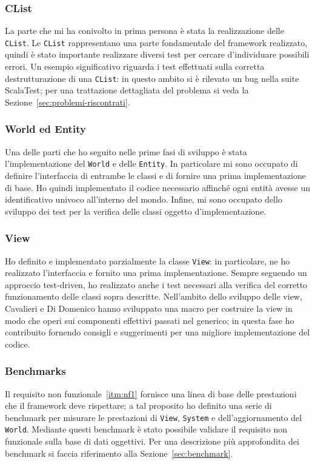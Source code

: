\subsubsection{CList}
La parte che mi ha conivolto in prima persona è stata la realizzazione delle \texttt{CList}.
Le \texttt{CList} rappresentano una parte fondamentale del framework realizzato, quindi è stato importante realizzare
diversi test per cercare d'individuare possibili errori.
Un esempio significativo riguarda i test effettuati sulla corretta destrutturazione di una \texttt{CList}: in questo
ambito si è rilevato un bug nella suite ScalaTest;
per una trattazione dettagliata del problema si veda la Sezione~\ref{sec:problemi-riscontrati}.

\subsubsection{World ed Entity}
Una delle parti che ho seguito nelle prime fasi di sviluppo è stata l'implementazione del \texttt{World} e delle
\texttt{Entity}.
In particolare mi sono occupato di definire l'interfaccia di entrambe le classi e di fornire una prima implementazione
di base.
Ho quindi implementato il codice necessario affinché ogni entità avesse un identificativo univoco all'interno del mondo.
Infine, mi sono occupato dello sviluppo dei test per la verifica delle classi oggetto d'implementazione.

\subsubsection{View}
Ho definito e implementato parzialmente la classe \texttt{View}: in particolare, ne ho realizzato l'interfaccia e
fornito una prima implementazione.
Sempre seguendo un approccio test-driven, ho realizzato anche i test necessari alla verifica del corretto funzionamento
delle classi sopra descritte.
Nell'ambito dello sviluppo delle view, Cavalieri e Di Domenico hanno sviluppato una macro per costruire la
view in modo che operi sui componenti effettivi passati nel generico;
in questa fase ho contribuito fornendo consigli e suggerimenti per una migliore implementazione del codice.

\subsubsection{Benchmarks}
Il requisito non funzionale~\ref{itm:nf1} fornisce una linea di base delle prestazioni che il framework deve rispettare;
a tal proposito ho definito una serie di benchmark per misurare le prestazioni di \texttt{View}, \texttt{System} e
dell'aggiornamento del \texttt{World}.
Mediante questi benchmark è stato possibile validare il requisito non funzionale sulla base di dati oggettivi.
Per una descrizione più approfondita dei benchmark si faccia riferimento alla Sezione~\ref{sec:benchmark}.

